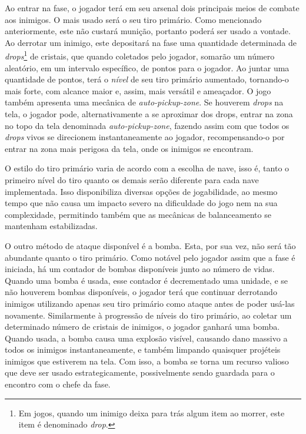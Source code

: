 Ao entrar na fase, o jogador terá em seu arsenal dois principais meios de combate aos inimigos. O mais usado será o seu tiro primário. Como mencionado anteriormente, este não custará munição, portanto poderá ser usado a vontade. Ao derrotar um inimigo, este depositará na fase uma quantidade determinada de \textit{drops}\footnote{
    Em jogos, quando um inimigo deixa para trás algum item ao morrer, este item é denominado \textit{drop}.
} de cristais, que quando coletados pelo jogador, somarão um número aleatório, em um intervalo específico, de pontos para o jogador. Ao juntar uma quantidade de pontos, terá o \textit{nível} de seu tiro primário aumentado, tornando-o mais forte, com alcance maior e, assim, mais versátil e ameaçador. O jogo também apresenta uma mecânica de \textit{auto-pickup-zone}. Se houverem \textit{drops} na tela, o jogador pode, alternativamente a se aproximar dos drops, entrar na zona no topo da tela denominada \textit{auto-pickup-zone}, fazendo assim com que todos os \textit{drops} vivos se direcionem instantaneamente ao jogador, recompensando-o por entrar na zona mais perigosa da tela, onde os inimigos se encontram.

O estilo do tiro primário varia de acordo com a escolha de nave, isso é, tanto o primeiro nível do tiro quanto os demais serão diferente para cada nave implementada. Isso disponibiliza diversas opções de jogabilidade, ao mesmo tempo que não causa um impacto severo na dificuldade do jogo nem na sua complexidade, permitindo também que as mecânicas de balanceamento se mantenham estabilizadas.

O outro método de ataque disponível é a bomba. Esta, por sua vez, não será tão abundante quanto o tiro primário. Como notável pelo jogador assim que a fase é iniciada, há um contador de bombas disponíveis junto ao número de vidas. Quando uma bomba é usada, esse contador é decrementado uma unidade, e se não houverem bombas disponíveis, o jogador terá que continuar derrotando inimigos utilizando apenas seu tiro primário como ataque antes de poder usá-las novamente. Similarmente à progressão de níveis do tiro primário, ao coletar um determinado número de cristais de inimigos, o jogador ganhará uma bomba. Quando usada, a bomba causa uma explosão visível, causando dano massivo a todos os inimigos instantaneamente, e também limpando quaisquer projéteis inimigos que estiverem na tela. Com isso, a bomba se torna um recurso valioso que deve ser usado estrategicamente, possivelmente sendo guardada para o encontro com o chefe da fase.

